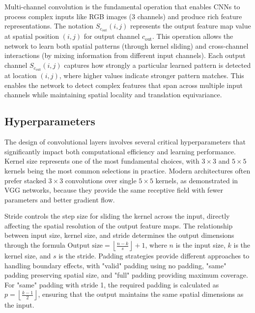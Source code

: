 
Multi-channel convolution is the fundamental operation that enables CNNs to process complex inputs like RGB images (3 channels) and produce rich feature representations. The notation $S_{c_{\text{out}}}(i,j)$ represents the output feature map value at spatial position $(i,j)$ for output channel $c_{\text{out}}$. This operation allows the network to learn both spatial patterns (through kernel sliding) and cross-channel interactions (by mixing information from different input channels). Each output channel $S_{c_{\text{out}}}(i,j)$ captures how strongly a particular learned pattern is detected at location $(i,j)$, where higher values indicate stronger pattern matches. This enables the network to detect complex features that span across multiple input channels while maintaining spatial locality and translation equivariance.

\subsection{Hyperparameters}

The design of convolutional layers involves several critical hyperparameters that significantly impact both computational efficiency and learning performance. Kernel size represents one of the most fundamental choices, with $3 \times 3$ and $5 \times 5$ kernels being the most common selections in practice. Modern architectures often prefer stacked $3\times3$ convolutions over single $5\times5$ kernels, as demonstrated in VGG networks, because they provide the same receptive field with fewer parameters and better gradient flow.\cite{GoodfellowEtAl2016}

Stride controls the step size for sliding the kernel across the input, directly affecting the spatial resolution of the output feature maps. The relationship between input size, kernel size, and stride determines the output dimensions through the formula $\text{Output size} = \left\lfloor \frac{n - k}{s} \right\rfloor + 1$, where $n$ is the input size, $k$ is the kernel size, and $s$ is the stride. Padding strategies provide different approaches to handling boundary effects, with "valid" padding using no padding, "same" padding preserving spatial size, and "full" padding providing maximum coverage. For "same" padding with stride 1, the required padding is calculated as $p = \left\lfloor \frac{k-1}{2} \right\rfloor$, ensuring that the output maintains the same spatial dimensions as the input.

